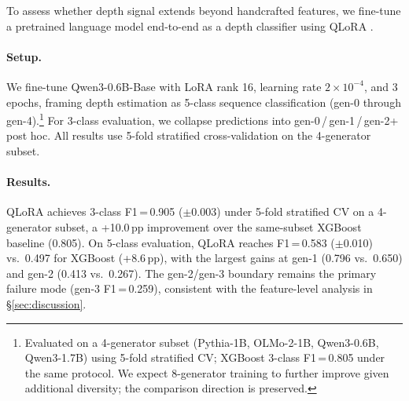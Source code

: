 To assess whether depth signal extends beyond handcrafted features, we fine-tune a pretrained language model end-to-end as a depth classifier using QLoRA \cite{qlora}.

\paragraph{Setup.}
We fine-tune Qwen3-0.6B-Base with LoRA rank 16, learning rate $2 \times 10^{-4}$, and 3 epochs, framing depth estimation as 5-class sequence classification (gen-0 through gen-4).\footnote{Evaluated on a 4-generator subset (Pythia-1B, OLMo-2-1B, Qwen3-0.6B, Qwen3-1.7B) using 5-fold stratified CV; XGBoost 3-class F1\,=\,0.805 under the same protocol. We expect 8-generator training to further improve given additional diversity; the comparison direction is preserved.}
For 3-class evaluation, we collapse predictions into gen-0\,/\,gen-1\,/\,gen-2+ post hoc.
All results use 5-fold stratified cross-validation on the 4-generator subset.

\begin{table}[ht]
\centering
\small
\caption{QLoRA end-to-end depth classification vs.\ XGBoost on handcrafted features, under 5-fold stratified CV (4-generator subset).}
\label{tab:qlora}
\end{table}

\paragraph{Results.}
QLoRA achieves 3-class F1\,=\,0.905 ($\pm$0.003) under 5-fold stratified CV on a 4-generator subset, a +10.0\,pp improvement over the same-subset XGBoost baseline (0.805).
On 5-class evaluation, QLoRA reaches F1\,=\,0.583 ($\pm$0.010) vs.\ 0.497 for XGBoost (+8.6\,pp), with the largest gains at gen-1 (0.796 vs.\ 0.650) and gen-2 (0.413 vs.\ 0.267).
The gen-2/gen-3 boundary remains the primary failure mode (gen-3 F1\,=\,0.259), consistent with the feature-level analysis in \S\ref{sec:discussion}.

